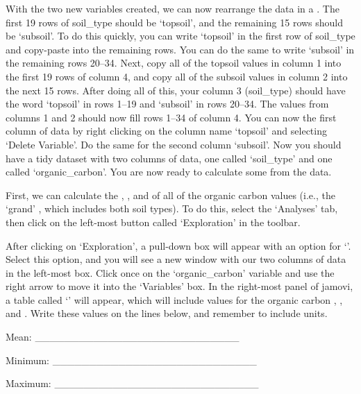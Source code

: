 \documentclass[
  openany]{krantz}
\begin{document}
With the two new variables created, we can now rearrange the data in a .
The first 19 rows of soil\_type should be `topsoil', and the remaining 15 rows should be `subsoil'.
To do this quickly, you can write `topsoil' in the first row of soil\_type and copy-paste into the remaining rows.
You can do the same to write `subsoil' in the remaining rows 20--34.
Next, copy all of the topsoil values in column 1 into the first 19 rows of column 4, and copy all of the subsoil values in column 2 into the next 15 rows.
After doing all of this, your column 3 (soil\_type) should have the word `topsoil' in rows 1--19 and `subsoil' in rows 20--34.
The values from columns 1 and 2 should now fill rows 1--34 of column 4.
You can now  the first column of data by right clicking on the column name `topsoil' and selecting `Delete Variable'.
Do the same for the second column `subsoil'.
Now you should have a tidy dataset with two columns of data, one called `soil\_type' and one called `organic\_carbon'.
You are now ready to calculate some  from the data.

First, we can calculate the , , and  of all of the organic carbon values (i.e., the `grand' , which includes both soil types).
To do this, select the `Analyses' tab, then click on the left-most button called `Exploration' in the toolbar.

After clicking on `Exploration', a pull-down box will appear with an option for `'.
Select this option, and you will see a new window with our two columns of data in the left-most box.
Click once on the `organic\_carbon' variable and use the right arrow to move it into the `Variables' box.
In the right-most panel of jamovi, a table called `' will appear, which will include values for the organic carbon , , and .
Write these values on the lines below, and remember to include units.

Mean: \_\_\_\_\_\_\_\_\_\_\_\_\_\_\_\_\_\_\_\_\_\_\_\_\_\_\_\_

Minimum: \_\_\_\_\_\_\_\_\_\_\_\_\_\_\_\_\_\_\_\_\_\_\_\_\_\_\_\_

Maximum: \_\_\_\_\_\_\_\_\_\_\_\_\_\_\_\_\_\_\_\_\_\_\_\_\_\_\_\_
\end{document}

